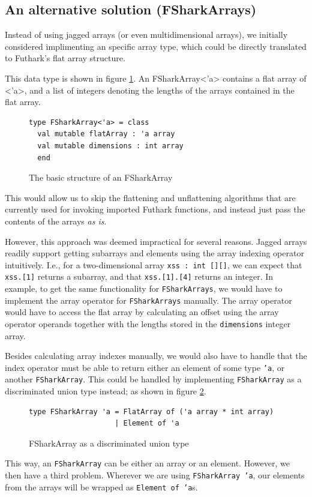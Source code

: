 \subsection{An alternative solution (FSharkArrays)}
Instead of using jagged arrays (or even multidimensional arrays), we initially
considered implimenting an \fshark{} specific array type, which could be directly
translated to Futhark's flat array structure.

This data type is shown in figure \ref{fig:fsharkarrays0}.
An FSharkArray<'a> contains a flat array of <'a>, and a list of integers
denoting the lengths of the arrays contained in the flat array.

\begin{figure}[H]
  \centering
\begin{verbatim}
type FSharkArray<'a> = class
  val mutable flatArray : 'a array 
  val mutable dimensions : int array
  end
\end{verbatim}
  \caption{The basic structure of an FSharkArray}
  \label{fig:fsharkarrays0}
\end{figure}

This would allow us to skip the flattening and unflattening algorithms that are
currently used for invoking imported Futhark functions, and instead just pass
the contents of the arrays \textit{as is}.

However, this approach was deemed impractical for several reasons.
Jagged arrays readily support getting subarrays and elements using the array
indexing operator intuitively. I.e., for a two-dimensional array \texttt{xss :
  int [][]}, we can expect that \texttt{xss.[1]} returns a subarray, and that \texttt{xss.[1].[4]}
returns an integer. 
In example, to get the same functionality for \texttt{FSharkArrays}, we would have to implement the
array operator for \texttt{FSharkArrays} manually. The array operator would have
to access the flat array by calculating an offset using the array operator
operands together with the lengths stored in the \texttt{dimensions} integer
array.

Besides calculating array indexes manually, we would also have to handle that
the index operator must be able to return either an element of some type
\texttt{'a}, or another \texttt{FSharkArray}. This could be handled by
implementing \texttt{FSharkArray} as a discriminated union type instead; as
shown in figure \ref{fig:fsharkarrays1}.

\begin{figure}[H]
  \centering
\begin{verbatim}
type FSharkArray 'a = FlatArray of ('a array * int array)
                    | Element of 'a
\end{verbatim}
  \caption{FSharkArray as a discriminated union type}
  \label{fig:fsharkarrays1}
\end{figure}
This way, an \texttt{FSharkArray} can be either an array or an element. However,
we then have a third problem.
Wherever we are using \texttt{FSharkArray 'a}, our elements from the arrays will be wrapped as
\texttt{Element of 'a}s.


